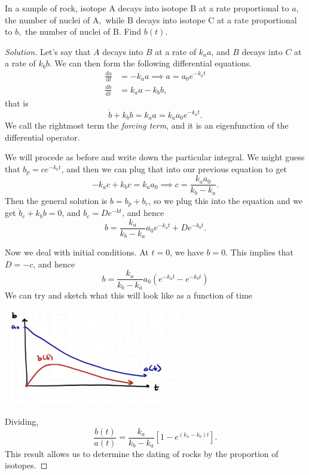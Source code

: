 \documentclass[a4paper]{scrreprt}
\newcommand{\dd}{\mathrm{d}}
\begin{document}
\begin{example}
	In a sample of rock, isotope A decays into isotope $\mathrm{B}$ at a rate proportional to $a$, the number of nuclei of $\mathrm{A},$ while $\mathrm{B}$ decays into isotope $\mathrm{C}$ at a rate proportional to $b,$ the number of nuclei of $\mathrm{B}$. Find $b(t)$.
\end{example}
\begin{proof}[Solution]
	Let's say that $A$ decays into $B$ at a rate of $k_a a$, and $B$ decays into $C$ at a rate of $k_b b$.
	We can then form the following differential equations.
	\begin{align*}
		\frac{\dd a}{\dd t} &= -k_a a \implies a = a_0 e^{-k_a t} \\
		\frac{\dd b}{\dd t} &= k_a a - k_b b,
	\end{align*}
	that is
	$$
	\dot{b} + k_b b = k_a a = k_a a_0 e^{-k_a t}.
	$$
	We call the rightmost term the \emph{forcing term}, and it is an eigenfunction of the differential operator.

	We will procede as before and write down the particular integral. We might guess that $b_p = ce^{-k_a t}$, and then we can plug that into our previous equation to get
	$$
	-k_a c + k_b c = k_a a_0 \implies c = \frac{k_a a_0}{k_b - k_a}.
	$$
	Then the general solution is $b = b_p + b_c$, so we plug this into the equation and we get $\dot{b}_c + k_b b = 0$, and $b_c = De^{-kt}$, and hence
	$$
b = \frac{k_a}{k_b - k_a} a_0 e^{-k_a t} + D e^{-k_b t}.
	$$

	Now we deal with initial conditions. At $t = 0$, we have $b = 0$. This implies that $D = -c$, and hence $$b = \frac{k_a}{k_b - k_a} a_0 \left(e^{-k_a t} - e^{-k_b t}\right)$$
	We can try and sketch what this will look like as a function of time
	\begin{center}
		\includegraphics[width=0.6\textwidth]{eigenfunction-forcing.png}
	\end{center}
	Dividing,
	$$
	\frac{b(t)}{a(t)} = \frac{k_a}{k_b - k_a} \left[1 - e^{(k_a - k_b)t}\right].
	$$
	This result allows us to determine the dating of rocks by the proportion of isotopes.
\end{proof}
\end{document}
